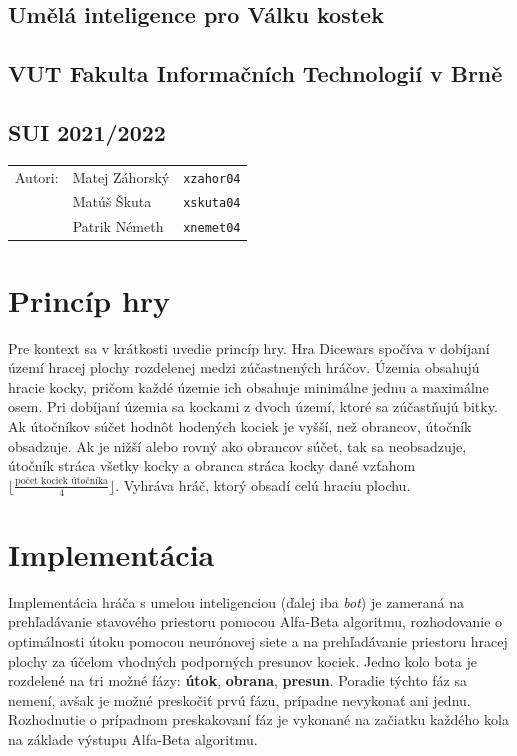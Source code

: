 \documentclass[pdftex, 11pt, a4paper, titlepage]{article}
\begin{document}
    \begin{center}
        \section*{Umělá inteligence pro Válku kostek}
        \subsection*{VUT Fakulta Informačních Technologií v Brně}
        \subsection*{SUI 2021/2022}
        \begin{tabular}{ r l l }
            Autori: & {Matej Záhorský} & \texttt{xzahor04} \\
            & {Matúš Škuta} & \texttt{xskuta04} \\
            & {Patrik Németh} & \texttt{xnemet04}
        \end{tabular}
    \end{center}

    \section{Princíp hry}
    Pre kontext sa v krátkosti uvedie princíp hry.
    Hra Dicewars spočíva v dobíjaní území hracej plochy rozdelenej medzi zúčastnených hráčov. Územia obsahujú hracie kocky, pričom každé územie ich obsahuje
    minimálne jednu a maximálne osem. Pri dobíjaní územia sa  kockami z dvoch území, ktoré sa zúčastňujú bitky. Ak útočníkov súčet hodnôt hodených kociek
    je vyšší, než obrancov, útočník obsadzuje. Ak je nižší alebo rovný ako obrancov súčet, tak sa neobsadzuje, útočník stráca všetky kocky a obranca stráca
    kocky dané vzťahom $\lfloor \frac{\text{počet kociek útočníka}}{\text{4}} \rfloor$. Vyhráva hráč, ktorý obsadí celú hraciu plochu.

    \section{Implementácia}
    Implementácia hráča s umelou inteligenciou (ďalej iba \emph{bot}) je zameraná na prehľadávanie stavového priestoru pomocou Alfa-Beta algoritmu,
    rozhodovanie o optimálnosti útoku pomocou neurónovej siete a na prehľadávanie priestoru hracej plochy za účelom vhodných podporných presunov kociek.
    Jedno kolo bota je rozdelené na tri možné fázy: \textbf{útok}, \textbf{obrana}, \textbf{presun}. Poradie týchto fáz sa nemení, avšak je možné preskočiť prvú fázu,
    prípadne nevykonať ani jednu. Rozhodnutie o prípadnom preskakovaní fáz je vykonané na začiatku každého kola na základe výstupu Alfa-Beta algoritmu.
\end{document}
